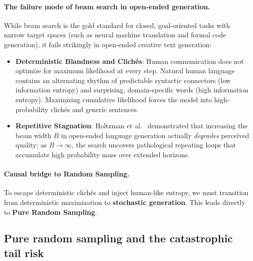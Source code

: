 \documentclass[../../main.tex]{subfiles}
\begin{document}
\paragraph{The failure mode of beam search in open-ended generation.}
While beam search is the gold standard for closed, goal-oriented tasks with narrow target spaces (such as neural machine translation and formal code generation), it fails strikingly in open-ended creative text generation:
\begin{itemize}
    \item \textbf{Deterministic Blandness and Clichés}: Human communication does not optimize for maximum likelihood at every step. Natural human language contains an alternating rhythm of predictable syntactic connectors (low information entropy) and surprising, domain-specific words (high information entropy). Maximizing cumulative likelihood forces the model into high-probability clichés and generic sentences.
    \item \textbf{Repetitive Stagnation}: Holtzman et al.~\cite{holtzman2020} demonstrated that increasing the beam width $B$ in open-ended language generation actually \emph{degrades} perceived quality: as $B \to \infty$, the search uncovers pathological repeating loops that accumulate high probability mass over extended horizons.
\end{itemize}

\paragraph{Causal bridge to Random Sampling.}
To escape deterministic clichés and inject human-like entropy, we must transition from deterministic maximization to \textbf{stochastic generation}. This leads directly to \textbf{Pure Random Sampling}.

\subsection{Pure random sampling and the catastrophic tail risk}
\label{subsec:random_sampling}
\end{document}
